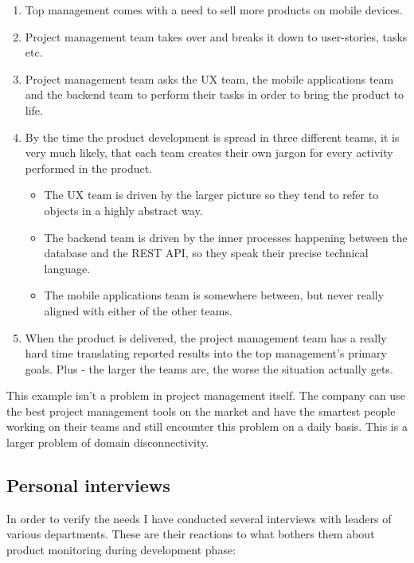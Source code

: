 \begin{enumerate}
	\item Top management comes with a need to sell more products on mobile devices.
	\item Project management team takes over and breaks it down to user-stories, tasks etc.
	\item Project management team asks the UX team, the mobile applications team and the backend team to perform their tasks in order to bring the product to life.
	\item By the time the product development is spread in three different teams, it is very much likely, that each team creates their own jargon for every activity performed in the product.
		\begin{itemize}
			\item The UX team is driven by the larger picture so they tend to refer to objects in a highly abstract way.
			\item The backend team is driven by the inner processes happening between the database and the REST API, so they speak their precise technical language.
			\item The mobile applications team is somewhere between, but never really aligned with either of the other teams.
		\end{itemize}
	\item When the product is delivered, the project management team has a really hard time translating reported results into the top management's primary goals. Plus - the larger the teams are, the worse the situation actually gets.
\end{enumerate}

This example isn't a problem in project management itself. The company can use the best project management tools on the market and have the smartest people working on their teams and still encounter this problem on a daily basis. This is a larger problem of domain disconnectivity.

\subsection{Personal interviews}

In order to verify the needs I have conducted several interviews with leaders of various departments. These are their reactions to what bothers them about product monitoring during development phase:

